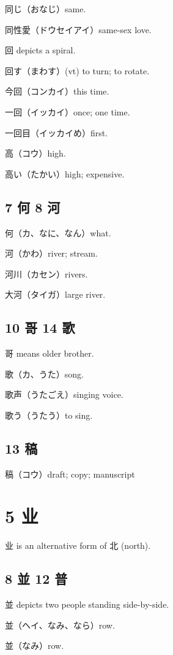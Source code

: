 同じ（おなじ）same.

同性愛（ドウセイアイ）same-sex love.

回 depicts a spiral.

回す（まわす）(vt) to turn; to rotate.

今回（コンカイ）this time.

一回（イッカイ）once; one time.

一回目（イッカイめ）first.

高（コウ）high.

高い（たかい）high; expensive.

\subsection{7 何 8 河}

何（カ、なに、なん）what.

河（かわ）river; stream.

河川（カセン）rivers.

大河（タイガ）large river.

\subsection{10 哥 14 歌}

哥 means older brother.

歌（カ、うた）song.

歌声（うたごえ）singing voice.

歌う（うたう）to sing.

\subsection{13 稿}

稿（コウ）draft; copy; manuscript

\section{5 业}

业 is an alternative form of 北 (north).

\subsection{8 並 12 普}

並 depicts two people standing side-by-side.

並（ヘイ、なみ、なら）row.

並（なみ）row.

